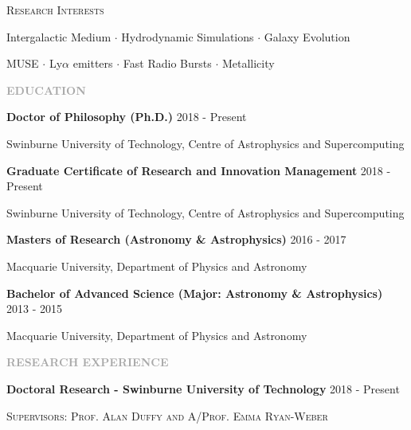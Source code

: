 \documentclass[11pt]{extarticle}
\def\Vhrulefill{{\color{BurntOrange}{\leavevmode\leaders\hrule height 1.2ex depth \dimexpr0.5pt-0.9ex\hfill\kern5pt}}}
\begin{document}
\vspace{4ex}
{\centering \Large \textsc{Research Interests} \par}
\vspace{1ex}
{\centering Intergalactic Medium $\cdot$ Hydrodynamic Simulations $\cdot$ Galaxy Evolution \par} {\centering MUSE $\cdot$ Ly$\alpha$ emitters $\cdot$ Fast Radio Bursts $\cdot$ Metallicity \par }
\vspace{3ex}
\noindent
\textcolor{darkgray}{\Large\normalfont\bfseries\MakeUppercase{Education}} \Vhrulefill
\vspace{2ex}

{\large \textbf{Doctor of Philosophy (Ph.D.)}} \hfill {\large 2018 - Present} \par 
Swinburne University of Technology, Centre of Astrophysics and Supercomputing \par
\noindent

\vspace{2ex}
{\large \textbf{Graduate Certificate of Research and Innovation Management}} \hfill {\large 2018 - Present} \par
Swinburne University of Technology, Centre of Astrophysics and Supercomputing \par
\vspace{2ex}

{\large \textbf{Masters of Research (Astronomy \& Astrophysics)}} \hfill {\large 2016 - 2017} \par
Macquarie University, Department of Physics and Astronomy \par 

\vspace{2ex}
{\large \textbf{Bachelor of Advanced Science (Major: Astronomy \& Astrophysics)}} \hfill {\large 2013 - 2015} \par
Macquarie University, Department of Physics and Astronomy
\par
\vspace{3ex}
\noindent
\textcolor{darkgray}{\Large\normalfont\bfseries\MakeUppercase{Research Experience}} \Vhrulefill
\vspace{2ex}

{\large \textbf{Doctoral Research - Swinburne University of Technology}} \hfill {\large 2018 - Present} \par
\textsc{Supervisors: Prof. Alan Duffy and A/Prof. Emma Ryan-Weber} \par
\vspace{2ex}
\end{document}
